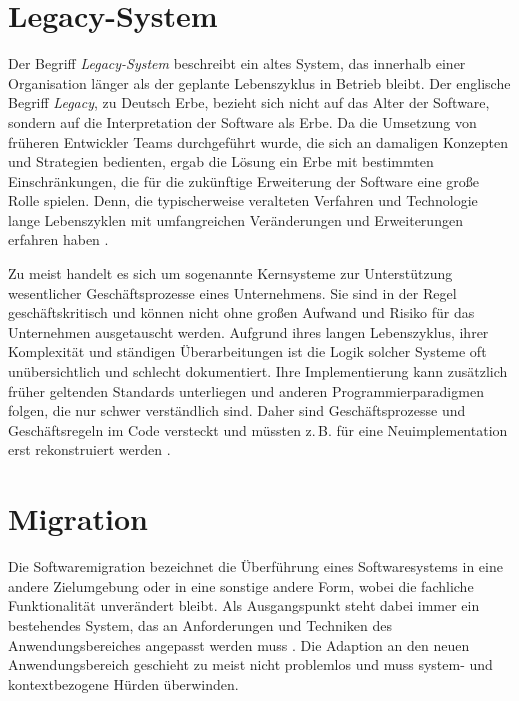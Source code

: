 \section{Legacy-System}

	Der Begriff \textit{Legacy-System} beschreibt ein altes System, das innerhalb einer Organisation länger als der geplante Lebenszyklus in Betrieb bleibt. Der englische Begriff \textit{Legacy}, zu Deutsch Erbe, bezieht sich nicht auf das Alter der Software, sondern auf die Interpretation der Software als Erbe. Da die Umsetzung von früheren Entwickler Teams durchgeführt wurde, die sich an damaligen Konzepten und Strategien bedienten, ergab die Lösung ein Erbe mit bestimmten Einschränkungen, die für die zukünftige Erweiterung der Software eine große Rolle spielen. Denn, die typischerweise veralteten Verfahren und Technologie lange Lebenszyklen mit umfangreichen Veränderungen und Erweiterungen erfahren haben \cite{sneed2016softwaremigration}. \bigbreak

	Zu meist handelt es sich um sogenannte Kernsysteme zur Unterstützung wesentlicher Geschäftsprozesse eines Unternehmens. Sie sind in der Regel geschäftskritisch und können nicht ohne großen Aufwand und Risiko für das Unternehmen ausgetauscht werden. Aufgrund ihres langen Lebenszyklus, ihrer Komplexität und ständigen Überarbeitungen ist die Logik solcher Systeme oft unübersichtlich und schlecht dokumentiert. Ihre Implementierung kann zusätzlich früher geltenden Standards unterliegen und anderen Programmierparadigmen folgen, die nur schwer verständlich sind. Daher sind Geschäftsprozesse und Geschäftsregeln im Code versteckt und müssten z.\,B. für eine Neuimplementation erst rekonstruiert werden \cite{martens2016ablosung}.

\section{Migration} \label{ssub:migration}

	Die Softwaremigration bezeichnet die Überführung eines Softwaresystems in eine andere Zielumgebung oder in eine sonstige andere Form, wobei die fachliche Funktionalität unverändert bleibt. Als Ausgangspunkt steht dabei immer ein bestehendes System, das an Anforderungen und Techniken des Anwendungsbereiches angepasst werden muss \cite{sneed2016softwaremigration}. Die Adaption an den neuen Anwendungsbereich geschieht zu meist nicht problemlos und muss system- und kontextbezogene Hürden überwinden. 

